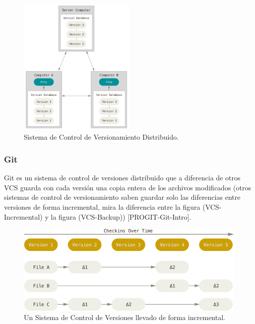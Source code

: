 \begin{figure}
  \begin{center}
      \includegraphics[width=0.5\textwidth]{Figures/dvcs.png}
  \end{center}
  \caption{Sistema de Control de Versionamiento Distribuido.} 
  \label{DVCS}
\end{figure}

\subsubsection{Git}
Git es un sistema de control de versiones distribuido que a diferencia de otros VCS guarda con cada versión una copia entera de los archivos modificados (otros sistemas de control de versionamiento saben guardar solo las diferencias entre versiones de forma incremental, mira la diferencia entre la figura (VCS-Incremental) y la figura (VCS-Backup)) [PROGIT-Git-Intro].

\begin{figure}
  \begin{center}
      \includegraphics[width=\textwidth]{Figures/vcs-incremental.png}
  \end{center}
  \caption{Un Sistema de Control de Versiones llevado de forma incremental.} 
  \label{VCS-Incremental}
\end{figure}

